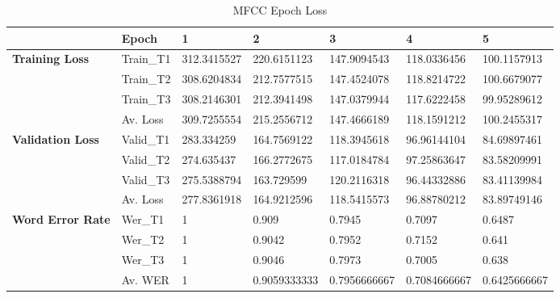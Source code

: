\begin{table}[!ht]
    \centering
    \caption{MFCC Epoch Loss}
    \begin{adjustbox}{width=\textwidth,keepaspectratio}
    \begin{tabular}{|l|l|l|l|l|l|l|}
    \hline
        \textbf{} & \textbf{Epoch} & \textbf{1} & \textbf{2} & \textbf{3} & \textbf{4} & \textbf{5} \\ \hline
        \textbf{Training Loss} & Train\_T1 & 312.3415527 & 220.6151123 & 147.9094543 & 118.0336456 & 100.1157913 \\ \hline
        \textbf{} & Train\_T2 & 308.6204834 & 212.7577515 & 147.4524078 & 118.8214722 & 100.6679077 \\ \hline
        \textbf{} & Train\_T3 & 308.2146301 & 212.3941498 & 147.0379944 & 117.6222458 & 99.95289612 \\ \hline
        \textbf{} & Av. Loss & 309.7255554 & 215.2556712 & 147.4666189 & 118.1591212 & 100.2455317 \\ \hline
        \textbf{Validation Loss} & Valid\_T1 & 283.334259 & 164.7569122 & 118.3945618 & 96.96144104 & 84.69897461 \\ \hline
        \textbf{} & Valid\_T2 & 274.635437 & 166.2772675 & 117.0184784 & 97.25863647 & 83.58209991 \\ \hline
        \textbf{} & Valid\_T3 & 275.5388794 & 163.729599 & 120.2116318 & 96.44332886 & 83.41139984 \\ \hline
        \textbf{} & Av. Loss & 277.8361918 & 164.9212596 & 118.5415573 & 96.88780212 & 83.89749146 \\ \hline
        \textbf{Word Error Rate} & Wer\_T1 & 1 & 0.909 & 0.7945 & 0.7097 & 0.6487 \\ \hline
        \textbf{} & Wer\_T2 & 1 & 0.9042 & 0.7952 & 0.7152 & 0.641 \\ \hline
        \textbf{} & Wer\_T3 & 1 & 0.9046 & 0.7973 & 0.7005 & 0.638 \\ \hline
        \textbf{} & Av. WER & 1 & 0.9059333333 & 0.7956666667 & 0.7084666667 & 0.6425666667 \\ \hline
    \end{tabular}
    \end{adjustbox}
    \label{mfcc_epochloss}
\end{table}


